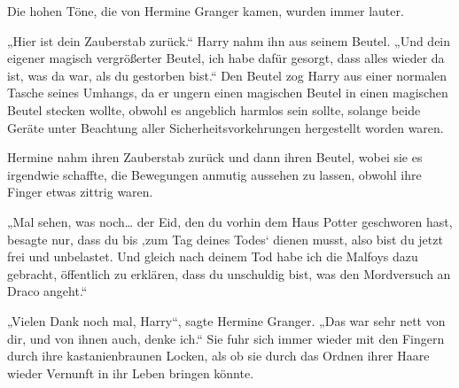 Die hohen Töne, die von Hermine Granger kamen, wurden immer lauter.

„Hier ist dein Zauberstab zurück.“
Harry nahm ihn aus seinem Beutel.
„Und dein eigener magisch vergrößerter Beutel, ich habe dafür gesorgt, dass alles wieder da ist, was da war, als du gestorben bist.“
Den Beutel zog Harry aus einer normalen Tasche seines Umhangs, da er ungern einen magischen Beutel in einen magischen Beutel stecken wollte, obwohl es angeblich harmlos sein sollte, solange beide Geräte unter Beachtung aller Sicherheitsvorkehrungen hergestellt worden waren.

Hermine nahm ihren Zauberstab zurück und dann ihren Beutel, wobei sie es irgendwie schaffte, die Bewegungen anmutig aussehen zu lassen, obwohl ihre Finger etwas zittrig waren.

„Mal sehen, was noch… der Eid, den du vorhin dem Haus Potter geschworen hast, besagte nur, dass du bis ‚zum Tag deines Todes‘ dienen musst, also bist du jetzt frei und unbelastet. Und gleich nach deinem Tod habe ich die Malfoys dazu gebracht, öffentlich zu erklären, dass du unschuldig bist, was den Mordversuch an Draco angeht.“

„Vielen Dank noch mal, Harry“, sagte Hermine Granger. „Das war sehr nett von dir, und von ihnen auch, denke ich.“
Sie fuhr sich immer wieder mit den Fingern durch ihre kastanienbraunen Locken, als ob sie durch das Ordnen ihrer Haare wieder Vernunft in ihr Leben bringen könnte.

